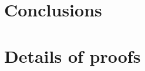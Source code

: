 \documentclass[natbib,preprint]{sigplanconf}
\begin{document}
\section{Conclusions}




\appendix

\section{Details of proofs}
\end{document}
